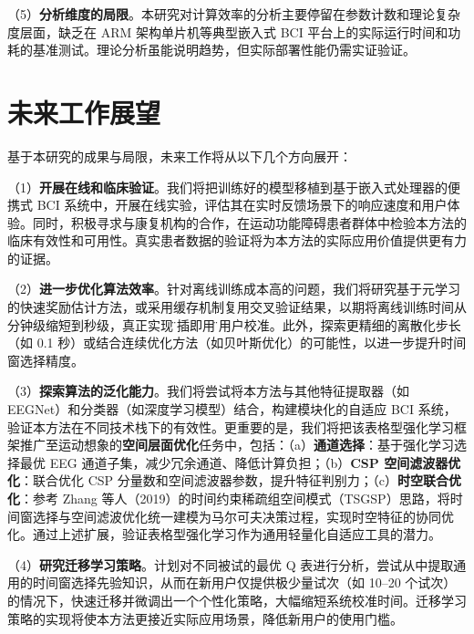 （5）\textbf{分析维度的局限}。本研究对计算效率的分析主要停留在参数计数和理论复杂度层面，缺乏在 ARM 架构单片机等典型嵌入式 BCI 平台上的实际运行时间和功耗的基准测试。理论分析虽能说明趋势，但实际部署性能仍需实证验证。

\section{未来工作展望}
\label{sec:future_work}

基于本研究的成果与局限，未来工作将从以下几个方向展开：

（1）\textbf{开展在线和临床验证}。我们将把训练好的模型移植到基于嵌入式处理器的便携式 BCI 系统中，开展在线实验，评估其在实时反馈场景下的响应速度和用户体验。同时，积极寻求与康复机构的合作，在运动功能障碍患者群体中检验本方法的临床有效性和可用性。真实患者数据的验证将为本方法的实际应用价值提供更有力的证据。

（2）\textbf{进一步优化算法效率}。针对离线训练成本高的问题，我们将研究基于元学习的快速奖励估计方法，或采用缓存机制复用交叉验证结果，以期将离线训练时间从分钟级缩短到秒级，真正实现\"即插即用\"的用户校准。此外，探索更精细的离散化步长（如 0.1 秒）或结合连续优化方法（如贝叶斯优化）的可能性，以进一步提升时间窗选择精度。

（3）\textbf{探索算法的泛化能力}。我们将尝试将本方法与其他特征提取器（如 EEGNet\cite{lawhern2018eegnet}）和分类器（如深度学习模型）结合，构建模块化的自适应 BCI 系统，验证本方法在不同技术栈下的有效性。更重要的是，我们将把该表格型强化学习框架推广至运动想象的\textbf{空间层面优化}任务中，包括：（a）\textbf{通道选择}：基于强化学习选择最优 EEG 通道子集，减少冗余通道、降低计算负担\cite{mcfarland1997spatial}；（b）\textbf{CSP 空间滤波器优化}：联合优化 CSP 分量数和空间滤波器参数，提升特征判别力\cite{lotte2011regularizing}；（c）\textbf{时空联合优化}：参考 Zhang 等人（2019）的时间约束稀疏组空间模式（TSGSP）思路\cite{zhang2019temporally}，将时间窗选择与空间滤波优化统一建模为马尔可夫决策过程，实现时空特征的协同优化。通过上述扩展，验证表格型强化学习作为通用轻量化自适应工具的潜力。

（4）\textbf{研究迁移学习策略}。计划对不同被试的最优 Q 表进行分析，尝试从中提取通用的时间窗选择先验知识，从而在新用户仅提供极少量试次（如 10--20 个试次）的情况下，快速迁移并微调出一个个性化策略，大幅缩短系统校准时间。迁移学习策略的实现将使本方法更接近实际应用场景，降低新用户的使用门槛。

